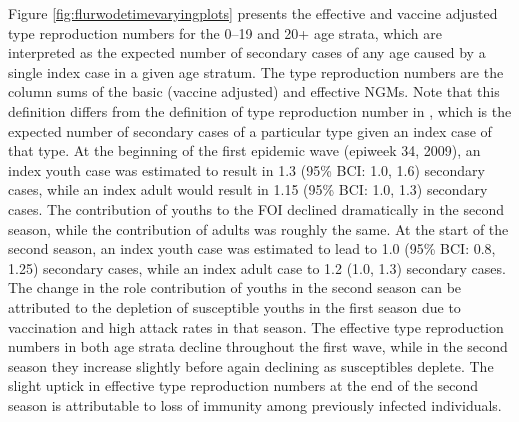 Figure \ref{fig:flurwodetimevaryingplots} presents the effective and vaccine adjusted type reproduction numbers for the 0--19 and 20+ age strata, which are interpreted as the expected number of secondary cases of any age caused by a single index case in a given age stratum. The type reproduction numbers are the column sums of the basic (vaccine adjusted) and effective NGMs. Note that this definition differs from the definition of type reproduction number in \cite{heesterbeek2007type}, which is the expected number of secondary cases of a particular type given an index case of that type. At the beginning of the first epidemic wave (epiweek 34, 2009), an index youth case was estimated to result in 1.3 (95\% BCI: 1.0, 1.6) secondary cases, while an index adult would result in 1.15 (95\% BCI: 1.0, 1.3) secondary cases. The contribution of youths to the FOI declined dramatically in the second season, while the contribution of adults was roughly the same. At the start of the second season, an index youth case was estimated to lead to 1.0 (95\% BCI: 0.8, 1.25) secondary cases, while an index adult case to 1.2 (1.0, 1.3) secondary cases. The change in the role contribution of youths in the second season can be attributed to the depletion of susceptible youths in the first season due to vaccination and high attack rates in that season. The effective type reproduction numbers in both age strata decline throughout the first wave, while in the second season they increase slightly before again declining as susceptibles deplete. The slight uptick in effective type reproduction numbers at the end of the second season is attributable to loss of immunity among previously infected individuals.  

